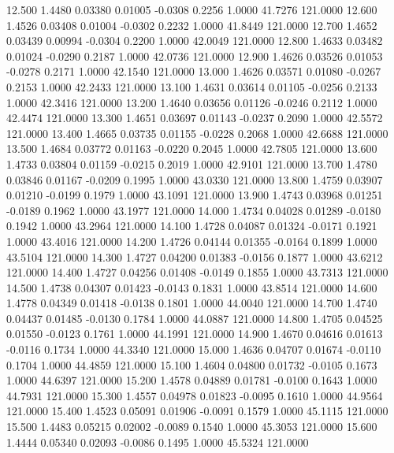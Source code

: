   12.500   1.4480   0.03380   0.01005  -0.0308   0.2256   1.0000  41.7276 121.0000
  12.600   1.4526   0.03408   0.01004  -0.0302   0.2232   1.0000  41.8449 121.0000
  12.700   1.4652   0.03439   0.00994  -0.0304   0.2200   1.0000  42.0049 121.0000
  12.800   1.4633   0.03482   0.01024  -0.0290   0.2187   1.0000  42.0736 121.0000
  12.900   1.4626   0.03526   0.01053  -0.0278   0.2171   1.0000  42.1540 121.0000
  13.000   1.4626   0.03571   0.01080  -0.0267   0.2153   1.0000  42.2433 121.0000
  13.100   1.4631   0.03614   0.01105  -0.0256   0.2133   1.0000  42.3416 121.0000
  13.200   1.4640   0.03656   0.01126  -0.0246   0.2112   1.0000  42.4474 121.0000
  13.300   1.4651   0.03697   0.01143  -0.0237   0.2090   1.0000  42.5572 121.0000
  13.400   1.4665   0.03735   0.01155  -0.0228   0.2068   1.0000  42.6688 121.0000
  13.500   1.4684   0.03772   0.01163  -0.0220   0.2045   1.0000  42.7805 121.0000
  13.600   1.4733   0.03804   0.01159  -0.0215   0.2019   1.0000  42.9101 121.0000
  13.700   1.4780   0.03846   0.01167  -0.0209   0.1995   1.0000  43.0330 121.0000
  13.800   1.4759   0.03907   0.01210  -0.0199   0.1979   1.0000  43.1091 121.0000
  13.900   1.4743   0.03968   0.01251  -0.0189   0.1962   1.0000  43.1977 121.0000
  14.000   1.4734   0.04028   0.01289  -0.0180   0.1942   1.0000  43.2964 121.0000
  14.100   1.4728   0.04087   0.01324  -0.0171   0.1921   1.0000  43.4016 121.0000
  14.200   1.4726   0.04144   0.01355  -0.0164   0.1899   1.0000  43.5104 121.0000
  14.300   1.4727   0.04200   0.01383  -0.0156   0.1877   1.0000  43.6212 121.0000
  14.400   1.4727   0.04256   0.01408  -0.0149   0.1855   1.0000  43.7313 121.0000
  14.500   1.4738   0.04307   0.01423  -0.0143   0.1831   1.0000  43.8514 121.0000
  14.600   1.4778   0.04349   0.01418  -0.0138   0.1801   1.0000  44.0040 121.0000
  14.700   1.4740   0.04437   0.01485  -0.0130   0.1784   1.0000  44.0887 121.0000
  14.800   1.4705   0.04525   0.01550  -0.0123   0.1761   1.0000  44.1991 121.0000
  14.900   1.4670   0.04616   0.01613  -0.0116   0.1734   1.0000  44.3340 121.0000
  15.000   1.4636   0.04707   0.01674  -0.0110   0.1704   1.0000  44.4859 121.0000
  15.100   1.4604   0.04800   0.01732  -0.0105   0.1673   1.0000  44.6397 121.0000
  15.200   1.4578   0.04889   0.01781  -0.0100   0.1643   1.0000  44.7931 121.0000
  15.300   1.4557   0.04978   0.01823  -0.0095   0.1610   1.0000  44.9564 121.0000
  15.400   1.4523   0.05091   0.01906  -0.0091   0.1579   1.0000  45.1115 121.0000
  15.500   1.4483   0.05215   0.02002  -0.0089   0.1540   1.0000  45.3053 121.0000
  15.600   1.4444   0.05340   0.02093  -0.0086   0.1495   1.0000  45.5324 121.0000
